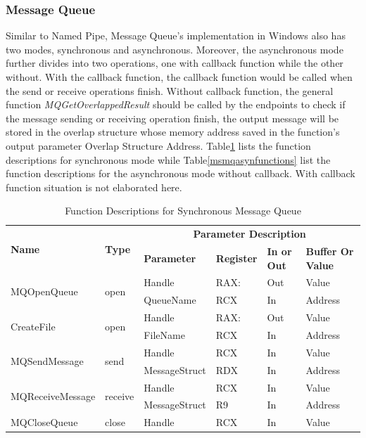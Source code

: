 \subsubsection{Message Queue}
Similar to Named Pipe, Message Queue's implementation in Windows also has two modes, synchronous and asynchronous. Moreover, the asynchronous mode further divides into two operations, one with callback function while the other without. With the callback function, the callback function would be called when the send or receive operations finish. Without callback function, the general function \textit{MQGetOverlappedResult} should be called by the endpoints to check if the message sending or receiving operation finish, the output message will be stored in the overlap structure whose memory address saved in the function's output parameter Overlap Structure Address. Table\ref{msmqsynfunctions} lists the function descriptions for synchronous mode while Table\ref{msmqasynfunctions} list the function descriptions for the asynchronous mode without callback. With callback function situation is not elaborated here.

\begin{table}[H]
  \centering
  \caption{Function Descriptions for Synchronous Message Queue}
  \label{msmqsynfunctions}
  \begin{tabular}{|l|l|l|l|l|l|}
      \hline
       \multirow{2}{*}{{\textbf{Name}}} & \multirow{2}{*}{{\textbf{Type}}} & \multicolumn{4}{c|}{\textbf{Parameter Description}}  \\
        \cline{3-6} 
       & & \textbf{Parameter}& \textbf{Register}& \textbf{In or Out} &  \textbf{Buffer Or Value}  \\
       \hline
       \multirow{2}{*}{MQOpenQueue}
       &\multirow{2}{*}{open} &  Handle & RAX: & Out & Value\\
        \cline{3-6} 
       & & QueueName & RCX & In & Address\\
      \hline         
      \multirow{2}{*}{CreateFile}
       &\multirow{2}{*}{open} &  Handle & RAX: & Out & Value\\
        \cline{3-6} 
       & & FileName & RCX & In & Address\\
      \hline              
      \multirow{2}{*}{MQSendMessage}
       &\multirow{2}{*}{send} &  Handle & RCX & In & Value\\
        \cline{3-6} 
       & & MessageStruct & RDX & In & Address\\
      \hline            
      \multirow{2}{*}{MQReceiveMessage}
       &\multirow{2}{*}{receive} &  Handle & RCX & In & Value\\
        \cline{3-6} 
       & & MessageStruct & R9 & In & Address\\
      \hline   
     MQCloseQueue &
       close &  Handle & RCX & In & Value\\
      \hline               
  \end{tabular}
\end{table}

